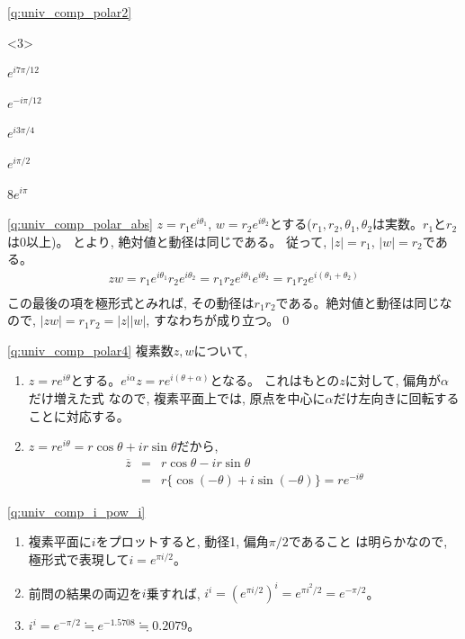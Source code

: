 \ref{q:univ_comp_polar2}  
\begin{edaenumerate}<3>
\item $e^{i7\pi/12}$
\item $e^{-i\pi/12}$
\item $e^{i3\pi/4}$
\item $e^{i\pi/2}$
\item $8e^{i\pi}$
\end{edaenumerate}
\hv

\ref{q:univ_comp_polar_abs} $z=r_1e^{i\theta_1}$, 
$w=r_2e^{i\theta_2}$とする($r_1, r_2, \theta_1, \theta_2$は実数。$r_1$と$r_2$は0以上)。
とより, 絶対値と動径は同じである。
従って, $|z|=r_1$, $|w|=r_2$である。
\begin{eqnarray}
zw=r_1e^{i\theta_1}r_2e^{i\theta_2}=r_1r_2e^{i\theta_1}e^{i\theta_2}
=r_1r_2e^{i(\theta_1+\theta_2)}\nonumber\\
\end{eqnarray}
この最後の項を極形式とみれば, その動径は$r_1r_2$である。絶対値と動径は同じなので, 
$|zw|=r_1r_2=|z||w|$, すなわちが成り立つ。\qed
\hv

%
\ref{q:univ_comp_polar4}  複素数$z, w$について,
\begin{enumerate}
\item $z=re^{i\theta}$とする。$e^{i\alpha}z=re^{i(\theta+\alpha)}$となる。
これはもとの$z$に対して, 偏角が$\alpha$だけ増えた式
なので, 複素平面上では, 原点を中心に$\alpha$だけ左向きに回転することに対応する。
\hv
\item $z=re^{i\theta}=r\cos\theta+ir\sin\theta$だから,
\begin{eqnarray*}
\overline{z}&=&r\cos\theta-ir\sin\theta\\
&=&r\{\cos(-\theta)+i\sin(-\theta)\}=re^{-i\theta}
\end{eqnarray*}
\end{enumerate}
\hv

\ref{q:univ_comp_i_pow_i}　
\begin{enumerate}
\item 複素平面に$i$をプロットすると, 動径1, 偏角$\pi/2$であること
は明らかなので, 極形式で表現して$i=e^{\pi i/2}$。
\item 前問の結果の両辺を$i$乗すれば, $i^i=(e^{\pi i/2})^i=e^{\pi i^2/2}=e^{-\pi/2}$。
\item $i^i=e^{-\pi/2}\fallingdotseq e^{-1.5708}\fallingdotseq0.2079$。
\end{enumerate}
\hv

